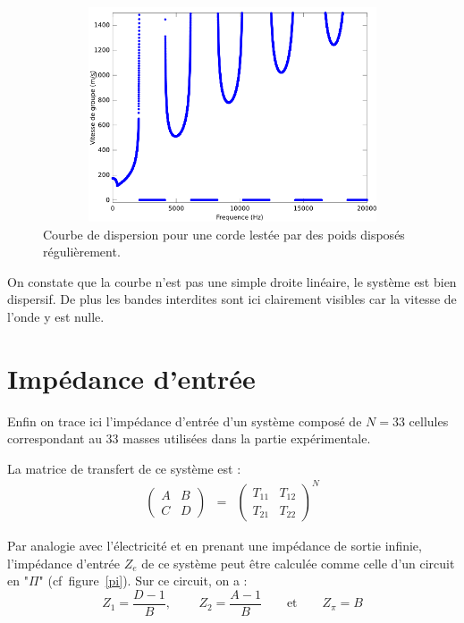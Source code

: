 \documentclass[a4paper,11pt]{report} %
\begin{document}
\begin{figure}[!h]\centering
\includegraphics[width=330pt,height = 180pt]{./figures/courbe_dispersion.png}
\caption{Courbe de dispersion pour une corde lestée par des poids disposés régulièrement.}
\label{dispers}
\end{figure}

On constate que la courbe n'est pas une simple droite linéaire, le système est bien dispersif. De plus les bandes interdites sont ici clairement visibles car la vitesse de l'onde y est nulle.

\section{Impédance d'entrée}

Enfin on trace ici l'impédance d'entrée d'un système composé de $N = 33$ cellules correspondant au 33 masses utilisées dans la partie expérimentale.

La matrice de transfert de ce système est :
\begin{eqnarray*}
\begin{pmatrix} A & B \\ C & D \end{pmatrix} & = & \begin{pmatrix} T_{11} & T_{12} \\ T_{21} & T_{22} \end{pmatrix}^{N}
\end{eqnarray*}	

Par analogie avec l'électricité et en prenant une impédance de sortie infinie, l'impédance d'entrée $Z_e$ de ce système peut être calculée comme celle d'un circuit en "$\Pi$" (cf~figure~\ref{pi}).
Sur ce circuit, on a : 
\begin{equation*}
	Z_1 = \frac{D-1}{B} \text{, } \qquad Z_2 = \frac{A-1}{B} \qquad \text{et} \qquad Z_{\pi}=B
\end{equation*}
\end{document}
